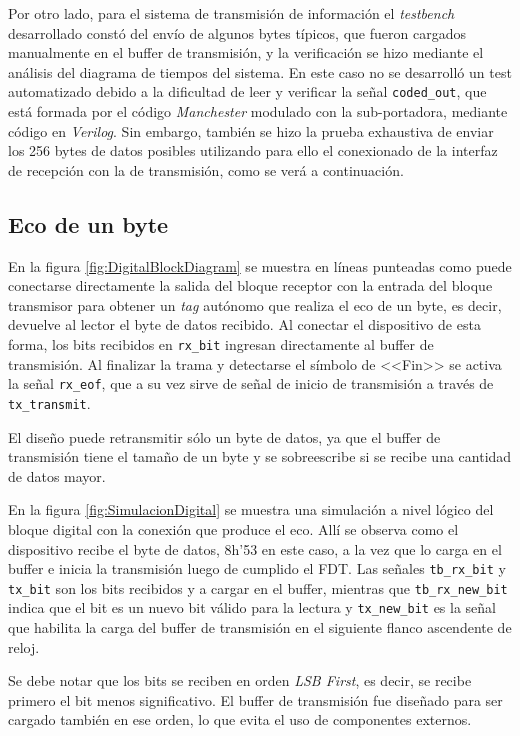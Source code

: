 Por otro lado, para el sistema de transmisión de información el 
\emph{testbench} desarrollado constó del envío de algunos bytes 
típicos, que fueron cargados manualmente en el buffer de transmisión, 
y la verificación se hizo mediante el análisis del diagrama de 
tiempos del sistema. En este caso no se desarrolló un test 
automatizado debido a la dificultad de leer y verificar la señal 
\lstinline{coded_out}, que está formada por el código 
\emph{Manchester} modulado con la sub-portadora, mediante código en 
\emph{Verilog}. Sin embargo, también se hizo la prueba exhaustiva 
de enviar los 256 bytes de datos posibles utilizando para ello el 
conexionado de la interfaz de recepción con la de transmisión, como 
se verá a continuación.

\subsection{Eco de un byte}

En la figura \ref{fig:DigitalBlockDiagram} se muestra en líneas 
punteadas como puede conectarse directamente la salida del bloque
receptor con la entrada del bloque transmisor para obtener un \emph{tag} 
autónomo que realiza el eco de un byte, es decir, devuelve al lector 
el byte de datos recibido. Al conectar el dispositivo de esta forma, 
los bits recibidos en \lstinline{rx_bit} ingresan directamente al 
buffer de transmisión. Al finalizar la trama y detectarse el símbolo 
de <<Fin>> se activa la señal \lstinline{rx_eof}, que a su vez sirve 
de señal de inicio de transmisión a través de \lstinline{tx_transmit}.

El diseño puede retransmitir sólo un byte de datos, ya que el buffer de 
transmisión tiene el tamaño de un byte y se sobreescribe si se recibe una 
cantidad de datos mayor.

En la figura \ref{fig:SimulacionDigital} se muestra una simulación a 
nivel lógico del bloque digital con la conexión que produce el eco. 
Allí se observa como el dispositivo recibe el byte de datos, 8h'53 
en este caso, a la vez que lo carga en el buffer e inicia la 
transmisión luego de cumplido el FDT. Las señales 
\lstinline {tb_rx_bit} y \lstinline{tx_bit} son los bits recibidos y 
a cargar en el buffer, mientras que \lstinline{tb_rx_new_bit} indica 
que el bit es un nuevo bit válido para la lectura y 
\lstinline {tx_new_bit} es la señal que habilita la carga del buffer 
de transmisión en el siguiente flanco ascendente de reloj.

Se debe notar que los bits se reciben en orden \emph{LSB First}, es 
decir, se recibe primero el bit menos significativo. El 
buffer de transmisión fue diseñado para ser cargado también en ese 
orden, lo que evita el uso de componentes externos.


